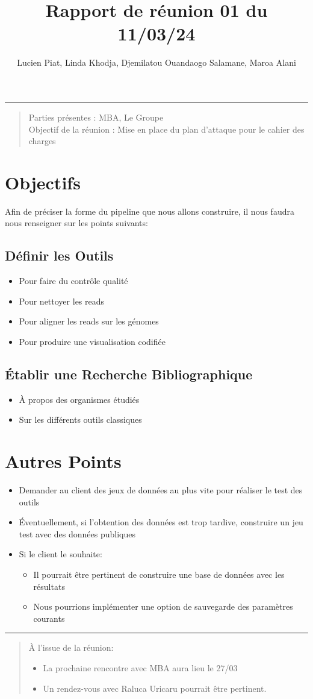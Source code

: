 \documentclass[a4paper, 11pt]{article}
\title{Rapport de réunion 01 du 11/03/24}
\author{Lucien Piat, Linda Khodja, Djemilatou Ouandaogo Salamane, Maroa Alani}
\begin{document}
\maketitle
\noindent\rule{8cm}{0.4pt}
\begin{quote}
    Parties présentes : MBA, Le Groupe\\
    Objectif de la réunion : Mise en place du plan d'attaque pour le cahier des charges
\end{quote}

\section{Objectifs}
Afin de préciser la forme du pipeline que nous allons construire, il nous faudra nous renseigner sur les points suivants:

\subsection{Définir les Outils}
\begin{itemize}
    \item Pour faire du contrôle qualité
    \item Pour nettoyer les reads
    \item Pour aligner les reads sur les génomes
    \item Pour produire une visualisation codifiée
\end{itemize}

\subsection{Établir une Recherche Bibliographique}
\begin{itemize}
    \item À propos des organismes étudiés
    \item Sur les différents outils classiques
\end{itemize}

\section{Autres Points}
\begin{itemize}
    \item Demander au client des jeux de données au plus vite pour réaliser le test des outils
    \item Éventuellement, si l'obtention des données est trop tardive, construire un jeu test avec des données publiques
    \item Si le client le souhaite:
    \begin{itemize}
        \item Il pourrait être pertinent de construire une base de données avec les résultats
        \item Nous pourrions implémenter une option de sauvegarde des paramètres courants
    \end{itemize}
\end{itemize}

\noindent\rule{8cm}{0.4pt}
\begin{quotation}
    À l'issue de la réunion:
    \begin{itemize}
        \item La prochaine rencontre avec MBA aura lieu le 27/03
        \item Un rendez-vous avec Raluca Uricaru pourrait être pertinent.
    \end{itemize}
\end{quotation}
\end{document}
